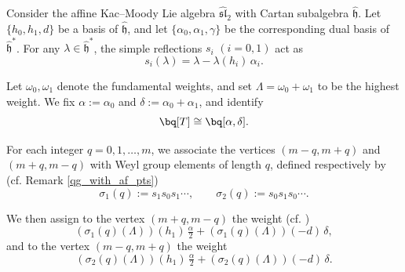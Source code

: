 \documentclass[10pt, a4paper, reqno]{amsart}
\begin{document}
\begin{rema}\label{label_on_vertices}
Consider the affine Kac--Moody Lie algebra $\widehat{\mathfrak{sl}}_{2}$ with Cartan subalgebra $\widehat{\mathfrak{h}}$.  
Let $\{h_0, h_1, d\}$ be a basis of $\widehat{\mathfrak{h}}$, and let $\{\alpha_0, \alpha_1, \gamma\}$ be the corresponding dual basis of $\widehat{\mathfrak{h}}^{*}$.  
For any $\lambda \in \widehat{\mathfrak{h}}^{*}$, the simple reflections $s_i$ $(i=0,1)$ act as
\[
s_i(\lambda) = \lambda - \lambda(h_i)\,\alpha_i.
\]

Let $\omega_0, \omega_1$ denote the fundamental weights, and set $\Lambda = \omega_0 + \omega_1$ to be the highest weight.  
We fix $\alpha := \alpha_0$ and $\delta := \alpha_0 + \alpha_1$, and identify 
\begin{equation}\label{toruspresent}
	\bq[T]\cong\bq[\alpha,\delta].
	\end{equation}  

For each integer $q = 0, 1, \ldots, m$, we associate the vertices $(m - q, m + q)$ and $(m + q, m - q)$ with Weyl group elements of length $q$, defined respectively by (cf. Remark \ref{qg_with_af_pts})
\[
\sigma_1(q) := s_1 s_0 s_1 \cdots, 
\qquad 
\sigma_2(q) := s_0 s_1 s_0 \cdots.
\]


We then assign to the vertex $(m + q, m -q)$ the weight (cf. \cite[Chapter 17]{carter})
\[
(\sigma_1(q)(\Lambda))(h_1)\, \tfrac{\alpha}{2}
+ (\sigma_1(q)(\Lambda))(-d)\, \delta,
\]
and to the vertex $(m - q, m +q)$ the weight
\[
(\sigma_2(q)(\Lambda))(h_1)\, \tfrac{\alpha}{2}
+ (\sigma_2(q)(\Lambda))(-d)\, \delta.
\]
\end{rema}
\end{document}

